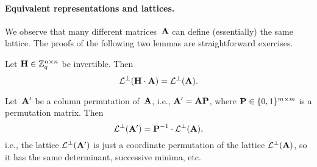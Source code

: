 \documentclass[11pt]{article}
\begin{document}
\paragraph{Equivalent representations and lattices.}

We observe that many different matrices~$\mathbf{A}$ can define
(essentially) the same lattice. The proofs of the following two lemmas
are straightforward exercises.

\begin{lemma}
  \label{lem:parity-check-invertible}
  Let $\mathbf{H} \in \mathbb{Z}_q^{n \times n}$ be invertible. Then
  \[ \mathcal{L}^{\perp}(\mathbf{H} \cdot \mathbf{A}) = \mathcal{L}^{\perp}(\mathbf{A}) . \]
\end{lemma}

\begin{lemma}
  \label{lem:parity-check-permutation}
  Let~$\mathbf{A}'$ be a column permutation of~$\mathbf{A}$, i.e.,
  $\mathbf{A}'=\mathbf{A}\mathbf{P}$, where $\mathbf{P} \in \{0,1\}^{m \times m}$ is a
  permutation matrix. Then
  \[ \mathcal{L}^{\perp}(\mathbf{A}') = \mathbf{P}^{-1} \cdot \mathcal{L}^{\perp}(\mathbf{A}) , \] i.e.,
  the lattice $\mathcal{L}^{\perp}(\mathbf{A}')$ is just a coordinate permutation of
  the lattice $\mathcal{L}^{\perp}(\mathbf{A})$, so it has the same determinant,
  successive minima, etc.
\end{lemma}

\end{document}
